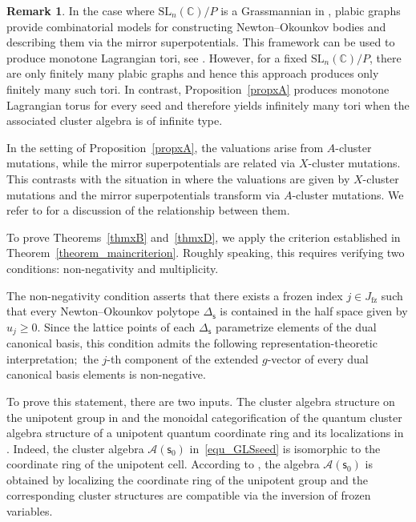 \documentclass[11pt]{amsart}
\newcommand{\C}{\mathbb{C}}
\numberwithin{equation}{section}
\theoremstyle{plain}
\theoremstyle{definition}
\newtheorem{remark}[theorem]{Remark}
\numberwithin{equation}{section}
\newcommand{\seed}{\mathsf{s}}
\begin{document}
\begin{remark}
In the case where $\mathrm{SL}_n(\C)/P$ is a Grassmannian in \cite{RW19}, plabic graphs provide combinatorial models for constructing Newton--Okounkov bodies and describing them via the mirror superpotentials. This framework can be used to produce monotone Lagrangian tori, see \cite{NU14, NU20, Cas23}. However, for a fixed $\mathrm{SL}_n(\C)/P$, there are only finitely many plabic graphs and hence this approach produces only finitely many such tori. In contrast, Proposition~\ref{propxA} produces monotone Lagrangian torus for every seed and therefore yields infinitely many tori when the associated cluster algebra is of infinite type.

In the setting of Proposition~\ref{propxA}, the valuations arise from $A$-cluster mutations, while the mirror superpotentials are related via $X$-cluster mutations. This contrasts with the situation in \cite{RW19} where the valuations are given by $X$-cluster mutations and the mirror superpotentials transform via $A$-cluster mutations. We refer to \cite[Section~7]{BCMN24} for a discussion of the relationship between them.
\end{remark}

To prove Theorems~\ref{thmxB} and~\ref{thmxD}, we apply the criterion established in Theorem~\ref{theorem_maincriterion}. Roughly speaking, this requires verifying two conditions: non-negativity and multiplicity.

The non-negativity condition asserts that there exists a frozen index $j \in J_\mathrm{fz}$ such that every Newton--Okounkov polytope $\Delta_\seed$ is contained in the half space given by $u_j \geq 0$. Since the lattice points of each $\Delta_\seed$ parametrize elements of the dual canonical basis, this condition admits the following representation-theoretic interpretation$;$ the $j$-th component of the extended $g$-vector of every dual canonical basis elements is non-negative.

To prove this statement, there are two inputs. 
The cluster algebra structure on the unipotent group in \cite{GLS11, KO21} and  the monoidal categorification of the quantum cluster algebra structure of a unipotent quantum coordinate ring and its localizations in \cite{KKKO18, KKOP21, KKOP23}. Indeed, the cluster algebra $\mathcal{A}(\seed_0)$ in~\eqref{equ_GLSseed} is isomorphic to the coordinate ring of the unipotent cell. According to \cite{GLS11}, the algebra $\mathcal{A}(\seed_0)$ is obtained by localizing the coordinate ring of the unipotent group and the corresponding cluster structures are compatible via the inversion of frozen variables.
\end{document}
